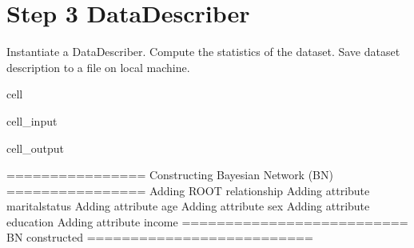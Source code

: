 \documentclass[letterpaper,10pt,english]{jupyterBook}
\begin{document}
\section{Step 3 DataDescriber}
\label{\detokenize{src/test/SynthNAV0:id10}}
\sphinxAtStartPar
Instantiate a DataDescriber.
Compute the statistics of the dataset.
Save dataset description to a file on local machine.

\begin{sphinxuseclass}{cell}\begin{sphinxVerbatimInput}

\begin{sphinxuseclass}{cell_input}
\begin{sphinxVerbatim}[commandchars=\\\{\}]
  
\end{sphinxVerbatim}

\end{sphinxuseclass}\end{sphinxVerbatimInput}
\begin{sphinxVerbatimOutput}

\begin{sphinxuseclass}{cell_output}
\begin{sphinxVerbatim}[commandchars=\\\{\}]
================ Constructing Bayesian Network (BN) ================
Adding ROOT relationship
Adding attribute marital\PYGZhy{}status
Adding attribute age
Adding attribute sex
Adding attribute education
Adding attribute income
========================== BN constructed ==========================
\end{sphinxVerbatim}


\end{sphinxuseclass}
\end{sphinxVerbatimOutput}
\end{sphinxuseclass}
\end{document}
